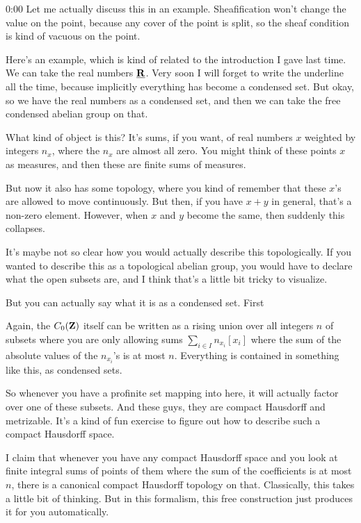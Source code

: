 \begin{unfinished}{0:00}
Let me actually discuss this in an example. Sheafification won't change the value on the point, because any cover of the point is split, so the sheaf condition is kind of vacuous on the point.

Here's an example, which is kind of related to the introduction I gave last time. We can take the real numbers $\underline{\mathbf R}$. Very soon I will forget to write the underline all the time, because implicitly everything has become a condensed set. But okay, so we have the real numbers as a condensed set, and then we can take the free condensed abelian group on that.

What kind of object is this? It's sums, if you want, of real numbers $x$ weighted by integers $n_x$, where the $n_x$ are almost all zero. You might think of these points $x$ as measures, and then these are finite sums of measures.

But now it also has some topology, where you kind of remember that these $x$'s are allowed to move continuously. But then, if you have $x + y$ in general, that's a non-zero element. However, when $x$ and $y$ become the same, then suddenly this collapses.

It's maybe not so clear how you would actually describe this topologically. If you wanted to describe this as a topological abelian group, you would have to declare what the open subsets are, and I think that's a little bit tricky to visualize.

But you can actually say what it is as a condensed set. First

Again, the $C_0(\mathbf Z)$ itself can be written as a rising union over all integers $n$ of subsets where you are only allowing sums $\sum_{i\in I} n_{x_i}[x_i]$ where the sum of the absolute values of the $n_{x_i}$'s is at most $n$. Everything is contained in something like this, as condensed sets.

So whenever you have a profinite set mapping into here, it will actually factor over one of these subsets. And these guys, they are compact Hausdorff and metrizable. It's a kind of fun exercise to figure out how to describe such a compact Hausdorff space.

I claim that whenever you have any compact Hausdorff space and you look at finite integral sums of points of them where the sum of the coefficients is at most $n$, there is a canonical compact Hausdorff topology on that. Classically, this takes a little bit of thinking. But in this formalism, this free construction just produces it for you automatically.


\end{unfinished}
